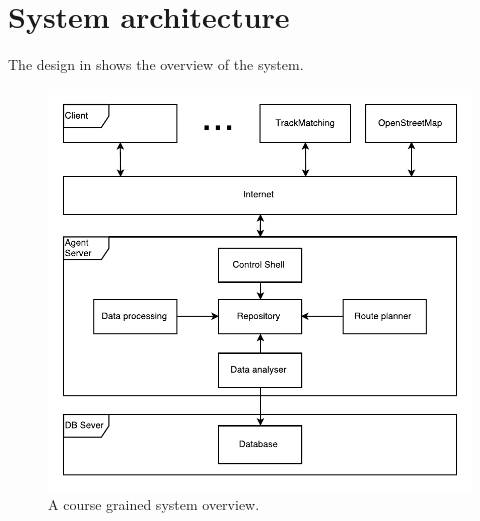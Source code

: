 \section{System architecture}
The design in  shows the overview of the system. 

\begin{figure}[h!]
  \centering
    \includegraphics[width=1\textwidth]{figures/architecture.pdf}
    \caption{A course grained system overview.}
    \label{fig:systemoverview}
\end{figure}

